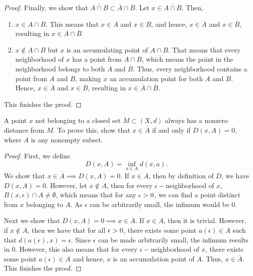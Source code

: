 \begin{proof}
    Finally, we show that $\overline{A \cap B} \subset \overline{A} \cap \overline{B} $. Let $x \in \overline{A \cap B}$. Then, 
    \begin{enumerate}
        \item $x \in A \cap B$. This means that $x \in A$ and $x \in B$, and hence, $x \in \overline{A}$ and $x \in \overline{B}$, resulting in $x \in \overline{A} \cap \overline{B}$.
        \item $x \notin A \cap B$ but $x$ is an accumulating point of $A \cap B$. That means that every neighborhood of $x$ has a point from $A \cap B$, which means the point in the neighborhood belongs to both $A$ and $B$. Thus, every neighborhood contains a point from $A$ and $B$, making $x$ an accumulation point for both $A$ and $B$. Hence, $x \in \overline{A}$ and $x \in \overline{B}$, resulting in $x \in \overline{A} \cap \overline{B}$.
    \end{enumerate}
    This finishes the proof.
\end{proof}

\begin{question}
    A point $x$ not belonging to a closed set $M \subset (X,d)$ always has a nonzero distance from $M$. To prove this, show that $x \in \overline{A}$ if and only if $D(x,A) = 0$, where $A$ is any nonempty subset.
\label{section1.3-10}
\end{question}
\begin{proof}
    First, we define 
    \[D(x,A) = \inf_{a \in A}d(x,a).\]
    We show that $x \in \overline{A} \implies D(x,A) = 0$. If $x \in A$, then by definition of $D$, we have $D(x,A) = 0$. However, let $x \notin A$, then for every $\epsilon-$neighborhood of $x$, $B(x,\epsilon) \cap A \neq \emptyset$, which means that for any $\epsilon > 0$, we can find a point distinct from $x$ belonging to $A$. As $\epsilon$ can be arbitrarily small, the infimum would be $0$.

    Next we show that $D(x,A) = 0 \implies x \in \overline{A}$. If $x \in A$, then it is trivial. However, if $x \notin A$, then we have that for all $\epsilon > 0$, there exists some point $a(\epsilon) \in A$ such that $d(a(\epsilon),x) = \epsilon$. Since $\epsilon$ can be made arbitrarily small, the infimum results in $0$. However, this also means that for every $\epsilon-$neighborhood of $x$, there exists some point $a(\epsilon) \in A$ and hence, $x$ is an accumulation point of $A$. Thus, $x \in \overline{A}$.
    This finishes the proof.
\end{proof}

